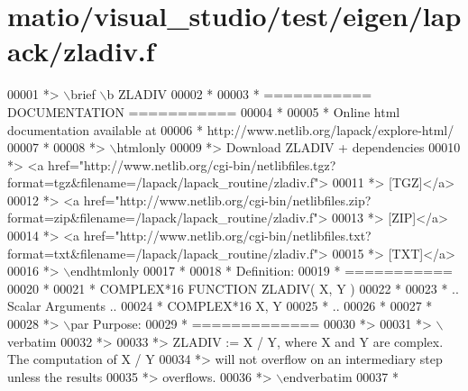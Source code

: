 \hypertarget{matio_2visual__studio_2test_2eigen_2lapack_2zladiv_8f_source}{}\section{matio/visual\+\_\+studio/test/eigen/lapack/zladiv.f}
\label{matio_2visual__studio_2test_2eigen_2lapack_2zladiv_8f_source}

\begin{DoxyCode}
00001 \textcolor{comment}{*> \(\backslash\)brief \(\backslash\)b ZLADIV}
00002 \textcolor{comment}{*}
00003 \textcolor{comment}{*  =========== DOCUMENTATION ===========}
00004 \textcolor{comment}{*}
00005 \textcolor{comment}{* Online html documentation available at }
00006 \textcolor{comment}{*            http://www.netlib.org/lapack/explore-html/ }
00007 \textcolor{comment}{*}
00008 \textcolor{comment}{*> \(\backslash\)htmlonly}
00009 \textcolor{comment}{*> Download ZLADIV + dependencies }
00010 \textcolor{comment}{*> <a
       href="http://www.netlib.org/cgi-bin/netlibfiles.tgz?format=tgz&filename=/lapack/lapack\_routine/zladiv.f"> }
00011 \textcolor{comment}{*> [TGZ]</a> }
00012 \textcolor{comment}{*> <a
       href="http://www.netlib.org/cgi-bin/netlibfiles.zip?format=zip&filename=/lapack/lapack\_routine/zladiv.f"> }
00013 \textcolor{comment}{*> [ZIP]</a> }
00014 \textcolor{comment}{*> <a
       href="http://www.netlib.org/cgi-bin/netlibfiles.txt?format=txt&filename=/lapack/lapack\_routine/zladiv.f"> }
00015 \textcolor{comment}{*> [TXT]</a>}
00016 \textcolor{comment}{*> \(\backslash\)endhtmlonly }
00017 \textcolor{comment}{*}
00018 \textcolor{comment}{*  Definition:}
00019 \textcolor{comment}{*  ===========}
00020 \textcolor{comment}{*}
00021 \textcolor{comment}{*       COMPLEX*16     FUNCTION ZLADIV( X, Y )}
00022 \textcolor{comment}{* }
00023 \textcolor{comment}{*       .. Scalar Arguments ..}
00024 \textcolor{comment}{*       COMPLEX*16         X, Y}
00025 \textcolor{comment}{*       ..}
00026 \textcolor{comment}{*  }
00027 \textcolor{comment}{*}
00028 \textcolor{comment}{*> \(\backslash\)par Purpose:}
00029 \textcolor{comment}{*  =============}
00030 \textcolor{comment}{*>}
00031 \textcolor{comment}{*> \(\backslash\)verbatim}
00032 \textcolor{comment}{*>}
00033 \textcolor{comment}{*> ZLADIV := X / Y, where X and Y are complex.  The computation of X / Y}
00034 \textcolor{comment}{*> will not overflow on an intermediary step unless the results}
00035 \textcolor{comment}{*> overflows.}
00036 \textcolor{comment}{*> \(\backslash\)endverbatim}
00037 \textcolor{comment}{*}

\end{DoxyCode}
